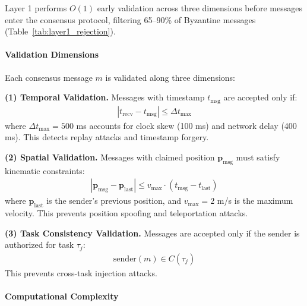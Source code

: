 \documentclass[lettersize,journal]{IEEEtran}
\begin{document}
Layer 1 performs $O(1)$ early validation across three dimensions before
messages enter the consensus protocol, filtering 65--90\% of Byzantine
messages (Table~\ref{tab:layer1_rejection}).

\paragraph{Validation Dimensions}
\label{sec:validation_dimensions}

Each consensus message $m$ is validated along three dimensions:

\textbf{(1) Temporal Validation.}
Messages with timestamp $t_{\text{msg}}$ are accepted only if:
\begin{equation}
\begin{aligned}
|t_{\text{recv}} - t_{\text{msg}}| \leq \Delta t_{\max}
\label{eq:temporal_validation}
\end{aligned}
\end{equation}
where $\Delta t_{\max} = 500$ ms accounts for clock skew (100 ms) and
network delay (400 ms). This detects replay attacks and timestamp forgery.

\textbf{(2) Spatial Validation.}
Messages with claimed position $\mathbf{p}_{\text{msg}}$ must satisfy
kinematic constraints:
\begin{equation}
\begin{aligned}
|\mathbf{p}_{\text{msg}} - \mathbf{p}_{\text{last}}|
\leq v_{\max} \cdot (t_{\text{msg}} - t_{\text{last}})
\label{eq:kinematic_validation}
\end{aligned}
\end{equation}
where $\mathbf{p}_{\text{last}}$ is the sender's previous position, and
$v_{\max} = 2$ m/s is the maximum velocity. This prevents position spoofing
and teleportation attacks.

\textbf{(3) Task Consistency Validation.}
Messages are accepted only if the sender is authorized for task $\tau_j$:
\begin{equation}
\begin{aligned}
\text{sender}(m) \in C(\tau_j)
\label{eq:task_consistency}
\end{aligned}
\end{equation}
This prevents cross-task injection attacks.

\paragraph{Computational Complexity}
\end{document}
